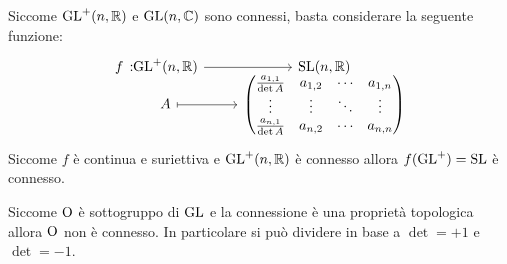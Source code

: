 \begin{demonstration}
	Siccome $\operatorname{GL}^+(n,\mathbb{R})$ e $\operatorname{GL}(n,\mathbb{C})$ sono connessi, basta considerare la seguente funzione:
		\begin{gather*}
			\funztot f {\gl^+(n,\realset)} {\Sl(n,\realset)} A {
				\begin{pmatrix}
					\frac{a_{1,1}}{\det A} & a_{1,2} & \cdots  & a_{1,n} \\
					\vdots                 & \vdots  & \ddots  & \vdots \\
					\frac{a_{n,1}}{\det A} & a_{n,2} & \cdots  & a_{n,n}
				\end{pmatrix}
			}			
		\end{gather*}
	Siccome $f$ è continua e suriettiva e $\operatorname{GL}^+(n,\mathbb{R})$ è connesso allora $f(\operatorname{GL}^+)=\operatorname{SL}$ è connesso.
\end{demonstration}

\begin{corollary}
\end{corollary}
\begin{demonstration}
	Siccome $\operatorname{O}$ è sottogruppo di $\operatorname{GL}$ e la connessione è una proprietà topologica allora $\operatorname{O}$ non è connesso. In particolare si può dividere in base a $\det =+1$ e $\det =-1$.
\end{demonstration}

